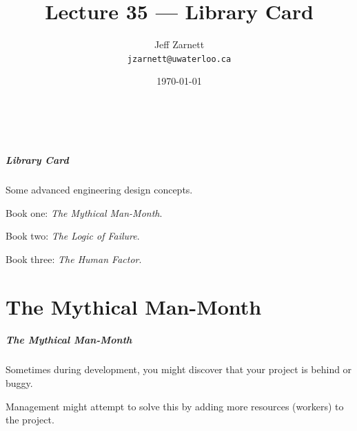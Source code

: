 
\usepackage{tikz-3dplot}

\title{Lecture 35 --- Library Card}

\author{Jeff Zarnett \\ \small \texttt{jzarnett@uwaterloo.ca}}
\date{\today}



\begin{frame}
  \titlepage

  \vfill
  \begin{center}
    \\
                  {\tiny\CcNote{\CcLongnameByNcSa}}
                  \vspace*{-2.5ex}
  \end{center}

\end{frame}


\begin{frame}
\frametitle{Library Card}
\begin{changemargin}{1cm}
Some advanced engineering design concepts.

Book one: \emph{The Mythical Man-Month}.

Book two: \emph{The Logic of Failure}. 

Book three: \emph{The Human Factor}. 

\end{changemargin}
\end{frame}

\part{The Mythical Man-Month}
\frame{\partpage}

\begin{frame}
\frametitle{The Mythical Man-Month}
\begin{changemargin}{1cm}

Sometimes during development, you might discover that your project is behind or buggy. 

Management might attempt to solve this by adding more resources (workers) to the project.
\end{changemargin}
\end{frame}

